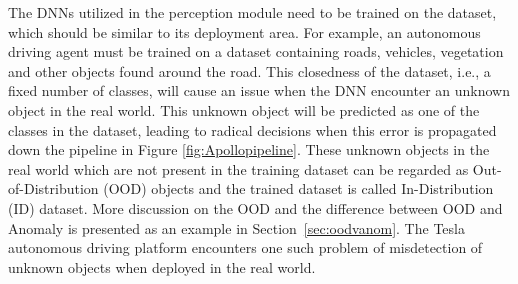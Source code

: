The DNNs utilized in the perception module need to be trained on the dataset, which should be similar to its deployment area.
For example, an autonomous driving agent must be trained on a dataset containing roads, vehicles, vegetation and other objects found around the road.
This closedness of the dataset, i.e., a fixed number of classes, will cause an issue when the DNN encounter an unknown object in the real world.
This unknown object will be predicted as one of the classes in the dataset, leading to radical decisions when this error is propagated down the pipeline in Figure \ref{fig:Apollopipeline}.
These unknown objects in the real world which are not present in the training dataset can be regarded as Out-of-Distribution (OOD) objects and the trained dataset is called In-Distribution (ID) dataset. 
More discussion on the OOD and the difference between OOD and Anomaly is presented as an example in Section~\ref{sec:oodvanom}.
The Tesla autonomous driving platform encounters one such problem of misdetection of unknown objects when deployed in the real world.
